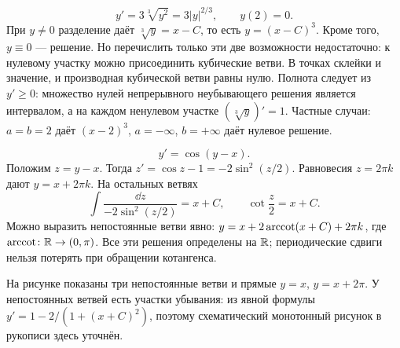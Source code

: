 \[
 y'=3\sqrt[3]{y^2}=3|y|^{2/3},\qquad y(2)=0.
\]
При $y\ne0$ разделение даёт $\sqrt[3]y=x-C$, то есть $y=(x-C)^3$.
Кроме того, $y\equiv0$ --- решение. Но перечислить только эти две
возможности недостаточно: к нулевому участку можно присоединить кубические ветви.
В точках склейки и значение, и производная кубической ветви равны нулю.
Полнота следует из $y'\ge0$: множество нулей непрерывного неубывающего
решения является интервалом, а на каждом ненулевом участке
$(\sqrt[3]y)'=1$. Частные случаи: $a=b=2$ даёт $(x-2)^3$,
$a=-\infty$, $b=+\infty$ даёт нулевое решение.

\[
 y'=\cos(y-x).
\]
Положим $z=y-x$. Тогда $z'=\cos z-1=-2\sin^2(z/2)$.
Равновесия $z=2\pi k$ дают $y=x+2\pi k$. На остальных ветвях
\[
 \int\frac{\dd z}{-2\sin^2(z/2)}=x+C,
 \qquad \cot\frac z2=x+C.
\]
Можно выразить непостоянные ветви явно:
$y=x+2\operatorname{arccot}(x+C)+2\pi k$, где $\operatorname{arccot}\colon\mathbb{R}\to(0,\pi)$.
Все эти решения определены на $\mathbb{R}$; периодические сдвиги нельзя
потерять при обращении котангенса.
\begin{center}
\end{center}
На рисунке показаны три непостоянные ветви и прямые $y=x$, $y=x+2\pi$.
У непостоянных ветвей есть участки убывания: из явной формулы
$y'=1-2/(1+(x+C)^2)$, поэтому схематический монотонный рисунок
в рукописи здесь уточнён.

